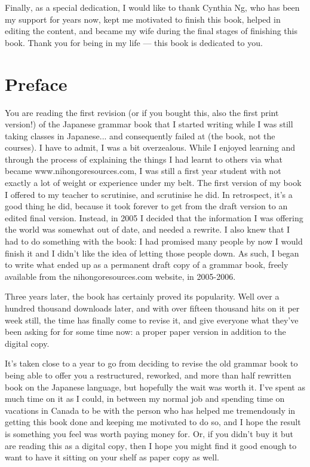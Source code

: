 \documentclass[11pt, b5paper, twoside, openright, onecolumn]{book}
\begin{document}
\pagebreak

\vspace*{\fill}

Finally‚ as a special dedication‚ I would like to thank Cynthia Ng‚ who has been my support for years now‚ kept me motivated to finish this book‚ helped in editing the content‚ and became my wife during the final stages of finishing this book. Thank you for being in my life — this book is dedicated to you.

\vspace*{\fill}

\vspace*{\fill}


	
\chapter*{Preface}

You are reading the first revision (or if you bought this‚ also the first print version!) of the Japanese grammar book that I started writing while I was still taking classes in Japanese... and consequently failed at (the book‚ not the courses). I have to admit‚ I was a bit overzealous. While I enjoyed learning and through the process of explaining the things I had learnt to others via what became www.nihongoresources.com‚ I was still a first year student with not exactly a lot of weight or experience under my belt. The first version of my book I offered to my teacher to scrutinise‚ and scrutinise he did. In retrospect‚ it’s a good thing he did‚ because it took forever to get from the draft version to an edited final version. Instead‚ in 2005 I decided that the information I was offering the world was somewhat out of date‚ and needed a rewrite. I also knew that I had to do something with the book: I had promised many people by now I would finish it and I didn’t like the idea of letting those people down. As such‚ I began to write what ended up as a permanent draft copy of a grammar book‚ freely available from the nihongoresources.com website‚ in 2005-2006.

Three years later‚ the book has certainly proved its popularity. Well over a hundred thousand downloads later‚ and with over fifteen thousand hits on it per week still‚ the time has finally come to revise it‚ and give everyone what they’ve been asking for for some time now: a proper paper version in addition to the digital copy.

It’s taken close to a year to go from deciding to revise the old grammar book to being able to offer you a restructured‚ reworked‚ and more than half rewritten book on the Japanese language‚ but hopefully the wait was worth it. I’ve spent as much time on it as I could‚ in between my normal job and spending time on vacations in Canada to be with the person who has helped me tremendously in getting this book done and keeping me motivated to do so‚ and I hope the result is something you feel was worth paying money for. Or‚ if you didn’t buy it but are reading this as a digital copy‚ then I hope you might find it good enough to want to have it sitting on your shelf as paper copy as well.
\end{document}
